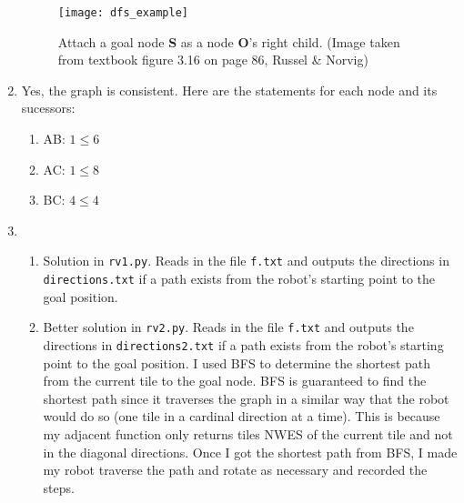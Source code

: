 \documentclass{article}
\begin{document}
\begin{enumerate}
    \begin{figure}[H]
        \centering
        \texttt{[image: dfs\_example]}
        \caption{Attach a goal node \textbf{S} as a node \textbf{O}'s right child. (Image taken from textbook figure 3.16 on page 86, Russel \& Norvig)}
    \end{figure}
    \item Yes, the graph is consistent. Here are the statements for each node and its sucessors:
    \begin{enumerate}
        \item AB: $1 \leq 6$
        \item AC: $1 \leq 8$
        \item BC: $4 \leq 4$
    \end{enumerate}
    \item
    \begin{enumerate}
        \item Solution in \texttt{rv1.py}. Reads in the file \texttt{f.txt} and outputs the directions in \texttt{directions.txt} if a path exists from the robot's starting point to the goal position.

        \item Better solution in \texttt{rv2.py}. Reads in the file \texttt{f.txt} and outputs the directions in \texttt{directions2.txt} if a path exists from the robot's starting point to the goal position. I used BFS to determine the shortest path from the current tile to the goal node. BFS is guaranteed to find the shortest path since it traverses the graph in a similar way that the robot would do so (one tile in a cardinal direction at a time). This is because my adjacent function only returns tiles NWES of the current tile and not in the diagonal directions. Once I got the shortest path from BFS, I made my robot traverse the path and rotate as necessary and recorded the steps.


\end{enumerate}
\end{enumerate}
\end{document}

